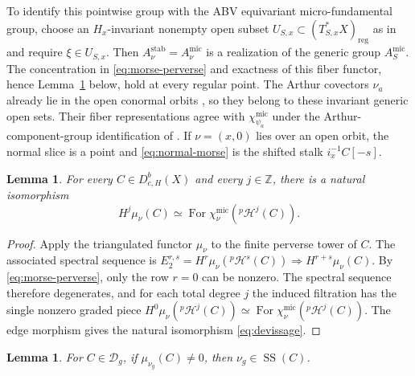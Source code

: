 \documentclass[10pt]{amsart}
\numberwithin{equation}{section}
\theoremstyle{plain}
\newtheorem{lemma}[proposition]{Lemma}
\theoremstyle{definition}
\theoremstyle{remark}
\DeclareMathOperator{\For}{For}
\newcommand{\ZZ}{\mathbb Z}
\newcommand{\mic}{\mathrm{mic}}
\newcommand{\SSupp}{\operatorname{SS}}
\begin{document}
To identify this pointwise group with the ABV equivariant
micro-fundamental group, choose an $H_x$-invariant nonempty open subset
$U_{S,x}\subset (T^*_{S,x}X)_{\mathrm{reg}}$ as in
\cite[Lemma~24.3(f) and Definition~24.7]{ABV92} and require
$\xi\in U_{S,x}$. Then $A_\nu^{\mathrm{stab}}=A_\nu^{\mic}$ is a
realization of the generic group $A_S^{\mic}$.
The concentration in \eqref{eq:morse-perverse} and exactness of this
fiber functor, hence Lemma~\ref{lem:devissage} below, hold at every
regular point.
The Arthur covectors $\nu_a$ already lie in the open conormal orbits
\cite[Proposition~3.7.1]{AIMV26}, so they belong to these invariant
generic open sets. Their fiber representations agree with
$\chi_{\psi_a}^{\mic}$ under the Arthur-component-group identification
of \cite[Proposition~22.9(e) and Definition~24.15]{ABV92}.
If $\nu=(x,0)$ lies
over an open orbit, the normal slice is a point and
\eqref{eq:normal-morse} is the shifted stalk $i_x^{-1}C[-s]$.

\begin{lemma}\label{lem:devissage}
For every $C\in D^b_{c,H}(X)$ and every $j\in\ZZ$, there is a natural isomorphism
\begin{equation}\label{eq:devissage}
 H^j\mu_\nu(C)
 \simeq
 \For\chi_\nu^{\mic}({}^p\mathcal H^j(C)).
\end{equation}
\end{lemma}

\begin{proof}
Apply the triangulated functor $\mu_\nu$ to the finite perverse tower of
$C$. The associated spectral sequence is
$E_2^{r,s}=H^r\mu_\nu({}^p\mathcal H^s(C))\Longrightarrow
H^{r+s}\mu_\nu(C)$. By \eqref{eq:morse-perverse}, only the row $r=0$ can
be nonzero. The spectral sequence therefore degenerates, and for each total
degree $j$ the induced filtration has the single nonzero graded piece
$H^0\mu_\nu({}^p\mathcal H^j(C))\simeq
\For\chi_\nu^{\mic}({}^p\mathcal H^j(C))$.
The edge morphism gives the natural isomorphism \eqref{eq:devissage}.
\end{proof}

\begin{lemma}\label{lem:morse-detects-ss}
For $C\in\mathcal D_g$, if $\mu_{\nu_g}(C)\neq0$, then
$\nu_g\in\SSupp(C)$.
\end{lemma}
\end{document}
